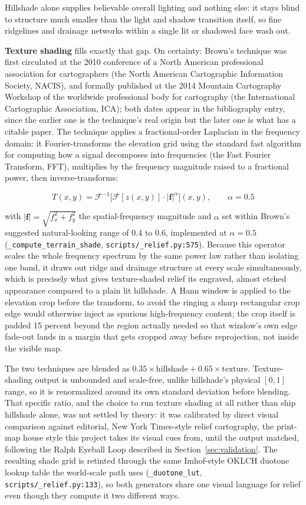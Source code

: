 \documentclass[11pt]{article}
\begin{document}
Hillshade alone supplies believable overall lighting and nothing else:
it stays blind to structure much smaller than the light and shadow
transition itself, so fine ridgelines and drainage networks within a
single lit or shadowed face wash out.

\textbf{Texture shading} \autocite{brown-texture-shading} fills exactly
that gap. On certainty: Brown's technique was first circulated at the
2010 conference of a North American professional association for
cartographers (the North American Cartographic Information Society,
NACIS), and formally published at the 2014 Mountain Cartography
Workshop of the worldwide professional body for cartography (the
International Cartographic Association, ICA); both dates appear in the
bibliography entry, since the earlier one is the technique's real
origin but the later one is what has a citable paper. The technique
applies a fractional-order Laplacian in the frequency domain: it
Fourier-transforms the elevation grid using the standard fast algorithm
for computing how a signal decomposes into frequencies (the Fast
Fourier Transform, FFT), multiplies by the frequency magnitude raised
to a fractional power, then inverse-transforms:

\[
T(x,y) = \mathcal{F}^{-1}\Big[\mathcal{F}[z(x,y)] \cdot |\mathbf{f}|^{\alpha}\Big](x,y), \qquad \alpha = 0.5
\]

with $|\mathbf{f}| = \sqrt{f_x^2+f_y^2}$ the spatial-frequency
magnitude and $\alpha$ set within Brown's suggested natural-looking
range of $0.4$ to $0.6$, implemented at $\alpha=0.5$
(\texttt{\_compute\_terrain\_shade}, \texttt{scripts/\_relief.py:575}).
Because this operator scales the whole frequency spectrum by the same
power law rather than isolating one band, it draws out ridge and
drainage structure at every scale simultaneously, which is precisely
what gives texture-shaded relief its engraved, almost etched appearance
compared to a plain lit hillshade. A Hann window is applied to the
elevation crop before the transform, to avoid the ringing a sharp
rectangular crop edge would otherwise inject as spurious high-frequency
content; the crop itself is padded 15 percent beyond the region
actually needed so that window's own edge fade-out lands in a margin
that gets cropped away before reprojection, not inside the visible map.

The two techniques are blended as $0.35 \times \text{hillshade} + 0.65
\times \text{texture}$. Texture-shading output is unbounded and
scale-free, unlike hillshade's physical $[0,1]$ range, so it is
renormalized around its own standard deviation before blending. That
specific ratio, and the choice to run texture shading at all rather
than ship hillshade alone, was not settled by theory: it was calibrated
by direct visual comparison against editorial, New York Times-style
relief cartography, the print-map house style this project takes its
visual cues from, until the output matched, following the Ralph
Eyeball Loop described in Section~\ref{sec:validation}. The resulting
shade grid is retinted through the same Imhof-style OKLCH duotone
lookup table the world-scale path uses (\texttt{\_duotone\_lut},
\texttt{scripts/\_relief.py:133}), so both generators share one visual
language for relief even though they compute it two different ways.
\end{document}
